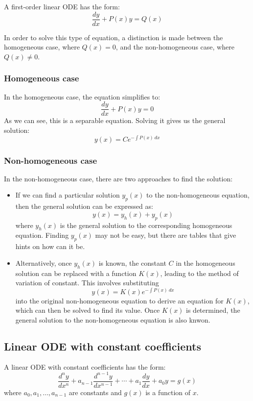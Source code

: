 A first-order linear ODE has the form:
\[
    \frac{dy}{dx} + P(x)y = Q(x)
\]

In order to solve this type of equation, a distinction is made between the homogeneous case, where $Q(x) = 0$, and the non-homogeneous case, where $Q(x) \neq 0$. 

\subsubsection{Homogeneous case}

In the homogeneous case, the equation simplifies to:
\[
    \frac{dy}{dx} + P(x)y = 0
\]
As we can see, this is a separable equation. Solving it gives us the general solution:
\[
    y(x) = Ce^{\displaystyle -\int P(x) \ dx}
\]

\subsubsection{Non-homogeneous case}
In the non-homogeneous case, there are two approaches to find the solution:
\begin{itemize}
    \item If we can find a particular solution $y_p(x)$ to the non-homogeneous equation, then the general solution can be expressed as:
    \[
        y(x) = y_h(x) + y_p(x)
    \]
    where $y_h(x)$ is the general solution to the corresponding homogeneous equation. Finding $y_p(x)$ may not be easy, but there are tables that give hints on how can it be.

    \item Alternatively, once $y_h(x)$ is known, the constant $C$ in the homogeneous solution can be replaced with a function $K(x)$, leading to the method of variation of constant. This involves substituting
    \[
        y(x) = K(x)e^{\displaystyle -\int P(x) \ dx}
    \]
    into the original non-homogeneous equation to derive an equation for $K(x)$, which can then be solved to find its value. Once $K(x)$ is determined, the general solution to the non-homogeneous equation is also knwon.
\end{itemize}

\subsection{Linear ODE with constant coefficients}

A linear ODE with constant coefficients has the form:
\[
    \frac{d^n y}{dx^n} + a_{n-1} \frac{d^{n-1} y}{dx^{n-1}} + \cdots + a_1 \frac{dy}{dx} + a_0 y = g(x)
\]
where $a_0, a_1, \ldots, a_{n-1}$ are constants and $g(x)$ is a function of $x$.

